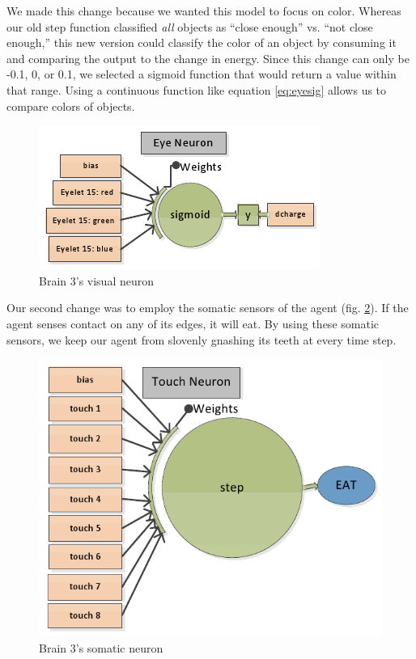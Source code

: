 We made this change because we wanted this model to focus on color. Whereas
our old step function classified \emph{all} objects as ``close enough'' vs. 
``not close enough,'' this new version could classify the color of an object by 
consuming it and comparing the output to the change in energy. Since this 
change 
can only be -0.1, 0, or 0.1, we selected a sigmoid function that would return 
a value within that range. Using a continuous function like equation 
\eqref{eq:eyesig} allows us to compare colors of objects.

\begin{figure}
\begin{center}
  \includegraphics[scale=.7]{img/brain3eye.png}
  \caption{Brain 3's visual neuron}
  \label{fig:brain3eye}
\end{center}
\end{figure}

Our second change was to employ the somatic sensors of the agent
(fig. \ref{fig:brain3touch}). If the agent senses contact on any of its edges, 
it will eat. By using these somatic sensors, we keep our agent from slovenly
gnashing its teeth at every time step.

\begin{figure}
\begin{center}
  \includegraphics[scale=.5]{img/brain3touch2.png}
  \caption{Brain 3's somatic neuron}
  \label{fig:brain3touch}
\end{center}
\end{figure}

